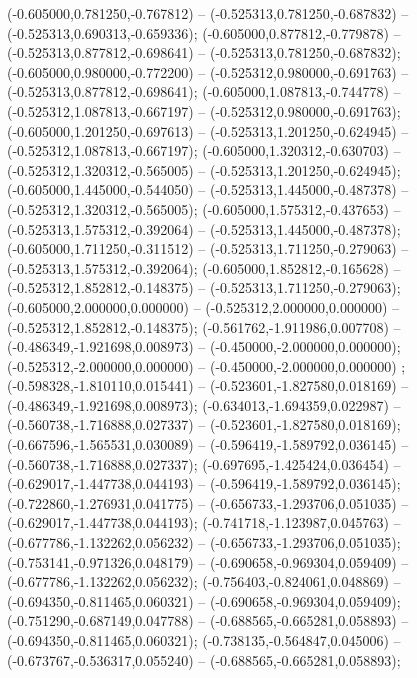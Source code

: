  (-0.605000,0.781250,-0.767812) -- (-0.525313,0.781250,-0.687832) -- (-0.525313,0.690313,-0.659336);
 (-0.605000,0.877812,-0.779878) -- (-0.525313,0.877812,-0.698641) -- (-0.525313,0.781250,-0.687832);
 (-0.605000,0.980000,-0.772200) -- (-0.525312,0.980000,-0.691763) -- (-0.525313,0.877812,-0.698641);
 (-0.605000,1.087813,-0.744778) -- (-0.525312,1.087813,-0.667197) -- (-0.525312,0.980000,-0.691763);
 (-0.605000,1.201250,-0.697613) -- (-0.525313,1.201250,-0.624945) -- (-0.525312,1.087813,-0.667197);
 (-0.605000,1.320312,-0.630703) -- (-0.525312,1.320312,-0.565005) -- (-0.525313,1.201250,-0.624945);
 (-0.605000,1.445000,-0.544050) -- (-0.525313,1.445000,-0.487378) -- (-0.525312,1.320312,-0.565005);
 (-0.605000,1.575312,-0.437653) -- (-0.525313,1.575312,-0.392064) -- (-0.525313,1.445000,-0.487378);
 (-0.605000,1.711250,-0.311512) -- (-0.525313,1.711250,-0.279063) -- (-0.525313,1.575312,-0.392064);
 (-0.605000,1.852812,-0.165628) -- (-0.525312,1.852812,-0.148375) -- (-0.525313,1.711250,-0.279063);
 (-0.605000,2.000000,0.000000) -- (-0.525312,2.000000,0.000000) -- (-0.525312,1.852812,-0.148375);
 (-0.561762,-1.911986,0.007708) -- (-0.486349,-1.921698,0.008973) -- (-0.450000,-2.000000,0.000000);
 (-0.525312,-2.000000,0.000000) -- (-0.450000,-2.000000,0.000000) ;
 (-0.598328,-1.810110,0.015441) -- (-0.523601,-1.827580,0.018169) -- (-0.486349,-1.921698,0.008973);
 (-0.634013,-1.694359,0.022987) -- (-0.560738,-1.716888,0.027337) -- (-0.523601,-1.827580,0.018169);
 (-0.667596,-1.565531,0.030089) -- (-0.596419,-1.589792,0.036145) -- (-0.560738,-1.716888,0.027337);
 (-0.697695,-1.425424,0.036454) -- (-0.629017,-1.447738,0.044193) -- (-0.596419,-1.589792,0.036145);
 (-0.722860,-1.276931,0.041775) -- (-0.656733,-1.293706,0.051035) -- (-0.629017,-1.447738,0.044193);
 (-0.741718,-1.123987,0.045763) -- (-0.677786,-1.132262,0.056232) -- (-0.656733,-1.293706,0.051035);
 (-0.753141,-0.971326,0.048179) -- (-0.690658,-0.969304,0.059409) -- (-0.677786,-1.132262,0.056232);
 (-0.756403,-0.824061,0.048869) -- (-0.694350,-0.811465,0.060321) -- (-0.690658,-0.969304,0.059409);
 (-0.751290,-0.687149,0.047788) -- (-0.688565,-0.665281,0.058893) -- (-0.694350,-0.811465,0.060321);
 (-0.738135,-0.564847,0.045006) -- (-0.673767,-0.536317,0.055240) -- (-0.688565,-0.665281,0.058893);
